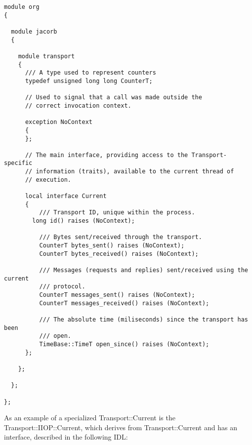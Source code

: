 \begin{verbatim}
module org
{

  module jacorb
  {

    module transport
    {
      /// A type used to represent counters
      typedef unsigned long long CounterT;

      // Used to signal that a call was made outside the
      // correct invocation context.

      exception NoContext
      {
      };

      // The main interface, providing access to the Transport-specific
      // information (traits), available to the current thread of
      // execution.

      local interface Current
      {
          /// Transport ID, unique within the process.
        long id() raises (NoContext);

          /// Bytes sent/received through the transport.
          CounterT bytes_sent() raises (NoContext);
          CounterT bytes_received() raises (NoContext);

          /// Messages (requests and replies) sent/received using the current
          /// protocol.
          CounterT messages_sent() raises (NoContext);
          CounterT messages_received() raises (NoContext);

          /// The absolute time (miliseconds) since the transport has been
          /// open.
          TimeBase::TimeT open_since() raises (NoContext);
      };

    };

  };

};
\end{verbatim}

As an example of a specialized Transport::Current is the Transport::IIOP::Current, 
which derives from Transport::Current and has an interface, described in the following IDL: 

